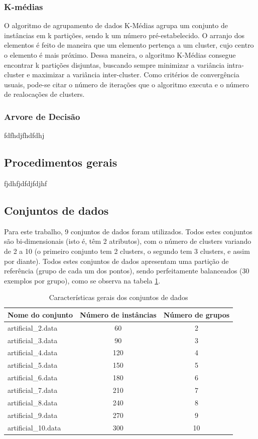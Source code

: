 \documentclass[12pt, a4paper]{article}
\begin{document}
\subsubsection{K-médias}
O algoritmo de agrupamento de dados K-Médias agrupa um conjunto de instâncias
em k partições, sendo k um número pré-estabelecido. O arranjo dos elementos é feito de maneira
que um elemento pertença a um cluster, cujo centro o elemento é mais próximo.
Dessa maneira, o algoritmo K-Médias consegue encontrar k partições disjuntas, buscando sempre
minimizar a variância intra-cluster e maximizar a variância inter-cluster. Como critérios de
convergência usuais, pode-se citar o número de iterações que o algoritmo executa e o número de
realocações de clusters.

\subsubsection{Arvore de Decisão}
fdfhdjfhdfdhj

\subsection{Procedimentos gerais}
fjdhfjdfdjfdjhf

\subsection{Conjuntos de dados}
Para este trabalho, 9 conjuntos de dados foram utilizados. Todos estes conjuntos são bi-dimensionais (isto é, têm 2 atributos), com o número de clusters variando de 2 a 10 (o primeiro conjunto tem 2 clusters, o segundo tem 3 clusters, e assim por diante). Todos estes conjuntos de dados apresentam uma partição de referência (grupo de cada um dos pontos), sendo perfeitamente balanceados (30 exemplos por grupo), como se observa na tabela \ref{conjDados}.
\begin{table}[!ht]
\centering
\caption{Características gerais dos conjuntos de dados}
\label{conjDados}
	\begin{tabular}{|l|c|c|}
	\hline
	Nome do conjunto & Número de instâncias & Número de grupos \\
	\hline
		artificial\_2.data & 60 & 2 \\
	\hline
		artificial\_3.data & 90 & 3 \\
	\hline
		artificial\_4.data & 120 & 4 \\
	\hline
		artificial\_5.data & 150 & 5 \\
	\hline
		artificial\_6.data & 180 & 6 \\
	\hline
		artificial\_7.data & 210 & 7 \\
	\hline
		artificial\_8.data & 240 & 8 \\
	\hline
		artificial\_9.data & 270 & 9 \\
	\hline
		artificial\_10.data & 300 & 10 \\
	\hline
	\end{tabular}
\end{table}
\end{document}
